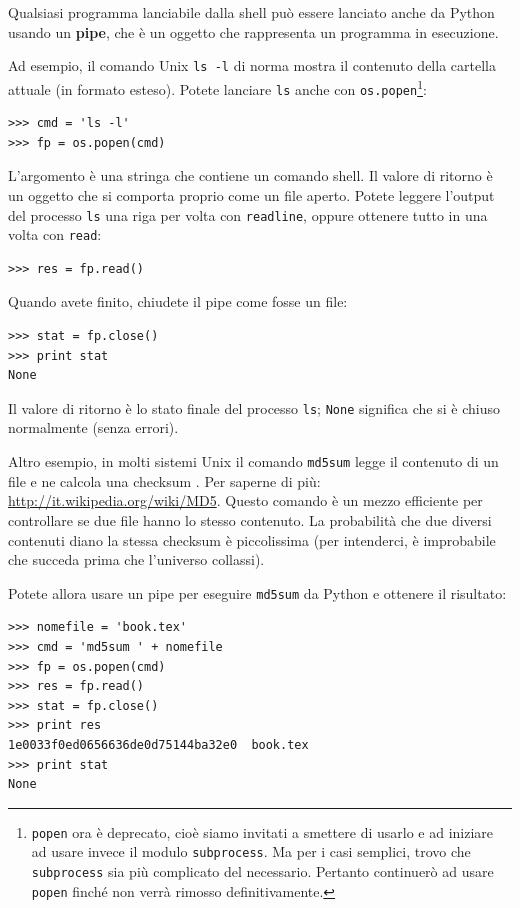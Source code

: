 \documentclass[10pt]{book}
\begin{document}
Qualsiasi programma lanciabile dalla shell può essere lanciato anche da Python usando un {\bf pipe}, che è un oggetto che rappresenta un programma in esecuzione.

Ad esempio, il comando Unix {\tt ls -l} di norma mostra il contenuto della cartella attuale (in formato esteso). Potete lanciare {\tt ls} anche con {\tt os.popen}\footnote{{\tt popen} ora è deprecato, cioè siamo invitati a smettere di usarlo e ad iniziare ad usare invece il modulo {\tt subprocess}. Ma per i casi semplici, trovo che
{\tt subprocess} sia più complicato del necessario. Pertanto continuerò ad usare {\tt popen} finché non verrà rimosso definitivamente.}:

\begin{verbatim}
>>> cmd = 'ls -l'
>>> fp = os.popen(cmd)
\end{verbatim}
%
L'argomento è una stringa che contiene un comando shell. Il valore di ritorno è un oggetto che si comporta proprio come un file aperto. Potete leggere l'output del processo {\tt ls} una riga per volta con {\tt readline}, oppure ottenere tutto in una volta con {\tt read}:

\begin{verbatim}
>>> res = fp.read()
\end{verbatim}
%
Quando avete finito, chiudete il pipe come fosse un file:

\begin{verbatim}
>>> stat = fp.close()
>>> print stat
None
\end{verbatim}
%
Il valore di ritorno è lo stato finale del processo {\tt ls};
{\tt None} significa che si è chiuso normalmente (senza errori).

Altro esempio, in molti sistemi Unix il comando {\tt md5sum}
legge il contenuto di un file e ne calcola una checksum . Per saperne di più: \url{http://it.wikipedia.org/wiki/MD5}.  Questo comando è un mezzo efficiente per controllare se due file hanno lo stesso contenuto. La probabilità che due diversi contenuti diano la stessa checksum è piccolissima (per intenderci, è improbabile che succeda prima che l'universo collassi).

Potete allora usare un pipe per eseguire {\tt md5sum} da Python e ottenere il risultato:

\begin{verbatim}
>>> nomefile = 'book.tex'
>>> cmd = 'md5sum ' + nomefile
>>> fp = os.popen(cmd)
>>> res = fp.read()
>>> stat = fp.close()
>>> print res
1e0033f0ed0656636de0d75144ba32e0  book.tex
>>> print stat
None
\end{verbatim}
\end{document}
